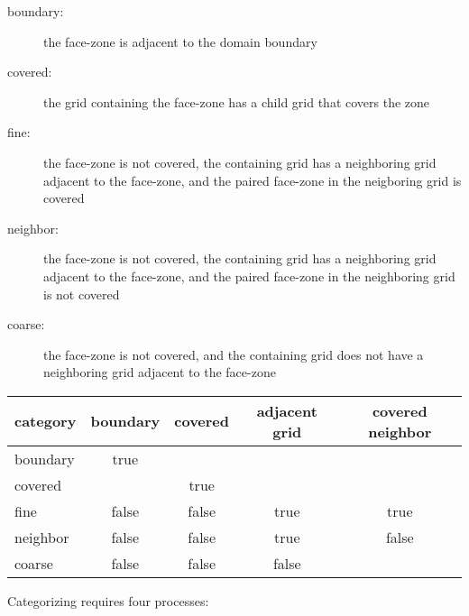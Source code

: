 \documentclass[10pt]{article}
\begin{document}
\begin{description}
\item [boundary: ] the face-zone is adjacent to the domain boundary
\item [covered: ] the grid containing the face-zone has a child grid that covers the zone
\item [fine: ] the face-zone is not covered, the containing grid has a neighboring grid adjacent to the face-zone, and the paired face-zone in the neigboring grid is covered
\item [neighbor: ] the face-zone is not covered, the containing grid has a neighboring grid adjacent to the face-zone, and the paired face-zone in the neighboring grid is not covered
\item [coarse: ] the face-zone is not covered, and the containing grid does not have a neighboring grid adjacent to the face-zone
\end{description}
\begin{tabular}{l|cccc}
category & boundary & covered & adjacent grid & covered neighbor \\ \hline
boundary & true &  \\
covered  &        & true \\
fine     & false & false & true & true \\
neighbor & false & false  & true& false \\
coarse   & false & false  & false \\
\end{tabular}

Categorizing requires four processes:
\end{document}
